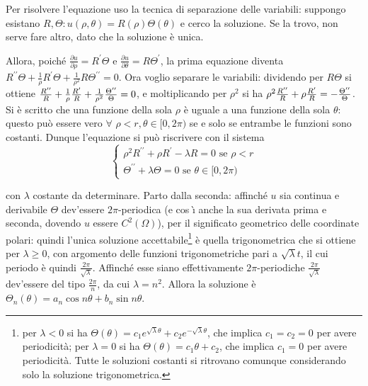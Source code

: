 \documentclass{article}
\begin{document}
Per risolvere l'equazione uso la tecnica di separazione delle variabili:
suppongo esistano $R,\Theta :u\left( \rho ,\theta \right) =R\left( \rho
\right) \Theta \left( \theta \right) $ e cerco la soluzione. Se la trovo,
non serve fare altro, dato che la soluzione \`{e} unica.

Allora, poich\'{e} $\frac{\partial u}{\partial \rho }=R^{\prime }\Theta $ e $%
\frac{\partial u}{\partial \theta }=R\Theta ^{\prime }$, la prima equazione
diventa $R^{\prime \prime }\Theta +\frac{1}{\rho }R^{\prime }\Theta +\frac{1%
}{\rho ^{2}}R\Theta ^{\prime \prime }=0$. Ora voglio separare le variabili:
dividendo per $R\Theta $ si ottiene $\frac{R^{\prime \prime }}{R}+\frac{1}{%
\rho }\frac{R^{\prime }}{R}+\frac{1}{\rho ^{2}}\frac{\Theta ^{\prime \prime }%
}{\Theta }=0$, e moltiplicando per $\rho ^{2}$ si ha $\rho ^{2}\frac{%
R^{\prime \prime }}{R}+\rho \frac{R^{\prime }}{R}=-\frac{\Theta ^{\prime
\prime }}{\Theta }$. Si \`{e} scritto che una funzione della sola $\rho $ 
\`{e} uguale a una funzione della sola $\theta $: questo pu\`{o} essere vero 
$\forall $ $\rho <r,\theta \in \lbrack 0,2\pi )$ se e solo se entrambe le
funzioni sono costanti. Dunque l'equazione si pu\`{o} riscrivere con il
sistema%
\begin{equation*}
\left\{ 
\begin{array}{c}
\rho ^{2}R^{\prime \prime }+\rho R^{\prime }-\lambda R=0\text{ se }\rho <r
\\ 
\Theta ^{\prime \prime }+\lambda \Theta =0\text{ se }\theta \in \lbrack
0,2\pi )%
\end{array}%
\right.
\end{equation*}

con $\lambda $ costante da determinare. Parto dalla seconda: affinch\'{e} $u$
sia continua e derivabile $\Theta $ dev'essere $2\pi $-periodica (e cos%
\`{\i} anche la sua derivata prima e seconda, dovendo $u$ essere $%
C^{2}\left( \Omega \right) $), per il significato geometrico delle
coordinate polari: quindi l'unica soluzione accettabile\footnote{%
per $\lambda <0$ si ha $\Theta \left( \theta \right) =c_{1}e^{\sqrt{\lambda }%
\theta }+c_{2}e^{-\sqrt{\lambda }\theta }$, che implica $c_{1}=c_{2}=0$ per
avere periodicit\`{a}; per $\lambda =0$ si ha $\Theta \left( \theta \right)
=c_{1}\theta +c_{2}$, che implica $c_{1}=0$ per avere periodicit\`{a}. Tutte
le soluzioni costanti si ritrovano comunque considerando solo la soluzione
trigonometrica.} \`{e} quella trigonometrica che si ottiene per $\lambda
\geq 0$, con argomento delle funzioni trigonometriche pari a $\sqrt{\lambda }%
t$, il cui periodo \`{e} quindi $\frac{2\pi }{\sqrt{\lambda }}$. Affinch\'{e}
esse siano effettivamente $2\pi $-periodiche $\frac{2\pi }{\sqrt{\lambda }}$
dev'essere del tipo $\frac{2\pi }{n}$, da cui $\lambda =n^{2}$. Allora la
soluzione \`{e} $\Theta _{n}\left( \theta \right) =a_{n}\cos n\theta
+b_{n}\sin n\theta $.
\end{document}
